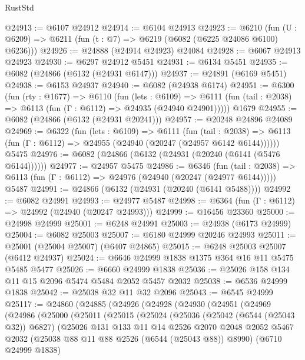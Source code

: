 \begin{lexlean}{RustStd}
\begin{coremodule}
@24913 := @6107 @24912
@24914 := @6104 @24913
@24923 := @6210
    (fun (U : @6209) => @6211 (fun (t : @7) => @6219 (@6082 (@6225 @24086 @6100) @6236)))
@24926 := @24888 (@24914 @24923) @24084
@24928 := @6067 @24913 @24923
@24930 := @6297 @24912 @5451
@24931 := @6134 @5451
@24935 := @6082 (@24866 (@6132 (@24931 @6147)))
@24937 := @24891 (@6169 @5451)
@24938 := @6153 @24937
@24940 := @6082 (@24938 @6174)
@24951 := @6300
    (fun (rty : @1677) =>
    @6110
      (fun (lets : @6109) =>
      @6111 (fun (tail : @2038) => @6113 (fun (Γ : @6112) => @24935 (@24940 @24901)))))
    @1679
@24955 := @6082 (@24866 (@6132 (@24931 @20241)))
@24957 := @20248 @24896 @24089
@24969 := @6322
    (fun (lets : @6109) =>
    @6111
      (fun (tail : @2038) =>
      @6113 (fun (Γ : @6112) => @24955 (@24940 (@20247 (@24957 @6142 @6144))))))
    @5475
@24976 := @6082 (@24866 (@6132 (@24931 (@20240 (@6141 (@5476 @6144))))))
@24977 := @24957 @5475
@24986 := @6346
    (fun (tail : @2038) => @6113 (fun (Γ : @6112) => @24976 (@24940 (@20247 (@24977 @6144)))))
    @5487
@24991 := @24866 (@6132 (@24931 (@20240 (@6141 @5488))))
@24992 := @6082 @24991
@24993 := @24977 @5487
@24998 := @6364 (fun (Γ : @6112) => @24992 (@24940 (@20247 @24993)))
@24999 := @16456 @23360
@25000 := @24998 @24999
@25001 := @6248 @24991
@25003 := @24938 (@6173 @24999)
@25004 := @6082 @25003
@25007 := @6180 @24999 @20246 @24993
@25011 := @25001 (@25004 @25007) (@6407 @24865)
@25015 := @6248 @25003 @25007 (@6412 @24937)
@25024 := @6646 @24999 @1838 @1375 @364 @16 @11 @5475 @5485 @5477
@25026 := @6660 @24999 @1838
@25036 := @25026 @158 @134 @11 @15 @2096 @5474 @5484 @2052 @5457 @2032
@25038 := @6536 @24999 @1838
@25042 := @25038 @32 @11 @32 @2096
@25043 := @6545 @24999
@25117 := @24860
    (@24885
      (@24926
        (@24928
          (@24930
            (@24951
              (@24969
                (@24986
                  (@25000
                    (@25011
                      (@25015
                        (@25024
                          (@25036
                            (@25042 (@6544 (@25043 @32)) @6827)
                            (@25026
                              @131
                              @133
                              @11
                              @14
                              @2526
                              @2070
                              @2048
                              @2052
                              @5467
                              @2032
                              (@25038 @88 @11 @88 @2526 (@6544 (@25043 @88)) @8990)
                              (@6710 @24999 @1838)

\end{coremodule}
\end{lexlean}
